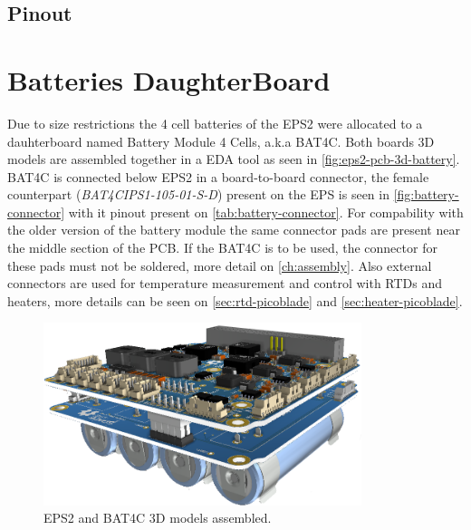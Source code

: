\subsection{Pinout}


\section{Batteries DaughterBoard}

Due to size restrictions the 4 cell batteries of the EPS2 were allocated to a dauhterboard named Battery Module 4 Cells, a.k.a BAT4C\cite{bat4c}. Both boards 3D models are assembled together in a EDA tool as seen in \autoref{fig:eps2-pcb-3d-battery}. BAT4C is connected below EPS2 in a board-to-board connector, the female counterpart (\textit{BAT4CIPS1-105-01-S-D}) present on the EPS is seen in \autoref{fig:battery-connector} with it pinout present on \autoref{tab:battery-connector}. For compability with the older version of the battery module the same connector pads are present near the middle section of the PCB. If the BAT4C is to be used, the connector for these pads must not be soldered, more detail on \autoref{ch:assembly}. Also external connectors are used for temperature measurement and control with RTDs and heaters, more details can be seen on \autoref{sec:rtd-picoblade} and \autoref{sec:heater-picoblade}. 

\begin{figure}[!ht]
    \begin{center}
        \includegraphics[width=93mm]{figures/eps2-pcb-3d-battery.png}
        \caption{EPS2 and BAT4C 3D models assembled.}
        \label{fig:eps2-pcb-3d-battery}
    \end{center}
\end{figure}

